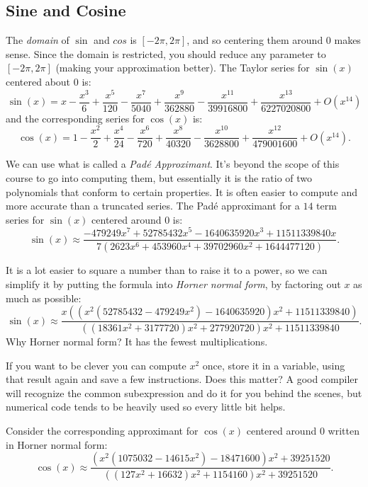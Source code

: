 \documentclass[11pt]{article}
\begin{document}
\subsection{Sine and Cosine}
The \emph{domain} of $\sin$ and $cos$ is $[-2\pi, 2\pi]$, and so
centering them around $0$ makes sense. Since the domain is restricted,
you should reduce any parameter to $[-2\pi, 2\pi]$ (making your
approximation better).  The Taylor series for $\sin(x)$ centered
about $0$ is:
$$ \sin(x) =
x-\frac{x^3}{6}+\frac{x^5}{120}-\frac{x^7}{5040}+\frac{x^9}{362880}-\frac{x^{11}}{3991680
   0}+\frac{x^{13}}{6227020800}+O\left(x^{14}\right)
$$
and the corresponding series for $\cos(x)$ is:
$$
\cos(x) =
1-\frac{x^2}{2}+\frac{x^4}{24}-\frac{x^6}{720}+\frac{x^8}{40320}-\frac{x^{10}}{3628800}+
\frac{x^{12}}{479001600}+O\left(x^{14}\right) .
$$

We can use what is called a \emph{Pad\'e Approximant}. It's beyond the
scope of this course to go into computing them, but essentially it is the ratio
of two polynomials that conform to certain properties. It is often
easier to compute and more accurate than a truncated series. The
Pad\'e approximant for a $14$ term series for $\sin(x)$ centered
around $0$ is:
$$
\sin(x)  \approx
\frac{-479249 x^7+52785432 x^5-1640635920 x^3+11511339840 x}{7 \left(2623 x^6+453960
   x^4+39702960 x^2+1644477120\right)} .
$$

It is a lot easier to square a number than to raise it to a power,
so we can simplify it by putting the formula into \emph{Horner normal
form}, by factoring out $x$ as much as possible:
$$
\sin(x)  \approx
\frac{x \left(\left(x^2 \left(52785432-479249 x^2\right)-1640635920\right)
   x^2+11511339840\right)}{\left(\left(18361 x^2+3177720\right) x^2+277920720\right)
   x^2+11511339840} .
$$
Why Horner normal form? It has the fewest multiplications.

If you want to be clever you can compute $x^2$ once, store it in a
variable, using that result again and save a few instructions. Does
this matter? A good compiler will recognize the common subexpression
and do it for you behind the scenes, but numerical code tends to
be heavily used so every little bit helps.

Consider the corresponding approximant for $\cos(x)$ centered around 0 written in
Horner normal form: 
$$
\cos(x)  \approx
\frac{\left(x^2 \left(1075032-14615 x^2\right)-18471600\right)
   x^2+39251520}{\left(\left(127 x^2+16632\right) x^2+1154160\right) x^2+39251520} .
$$
\end{document}
